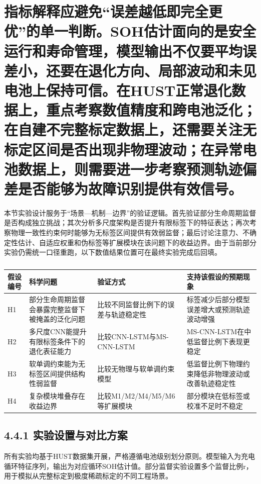 \documentclass[12pt, a4paper]{ctexart}
\begin{document}
\section{指标解释应避免“误差越低即完全更优”的单一判断。SOH估计面向的是安全运行和寿命管理，模型输出不仅要平均误差小，还要在退化方向、局部波动和未见电池上保持可信。在HUST正常退化数据上，重点考察数值精度和跨电池泛化；在自建不完整标定数据上，还需要关注无标定区间是否出现非物理波动；在异常电池数据上，则需要进一步考察预测轨迹偏差是否能够为故障识别提供有效信号。}

本节实验设计服务于“场景—机制—边界”的验证逻辑。首先验证部分生命周期监督是否构成独立挑战；其次分析多尺度架构是否提升有限标签下的特征表达；再次考察物理一致性约束何时能够为无标签区间提供有效弱监督；最后讨论注意力、不确定性估计、自适应权重和伪标签等扩展模块在该问题下的收益边界。由于当前部分实验仍需统一口径重跑，以下数值结果位置可在最终实验完成后回填。




\begin{table}[H]
  \centering
  \begin{tabular}{llll}
  \toprule
  假设编号 & 科学问题 & 验证方式 & 支持该假设的预期现象 \\
  \midrule
  H1 & 部分生命周期监督会暴露完整监督下被掩盖的泛化问题 & 比较不同监督比例下的误差与轨迹稳定性 & 标签减少后部分模型误差增大或预测轨迹波动增强 \\
  H2 & 多尺度CNN能提升有限标签条件下的退化表征能力 & 比较CNN-LSTM与MS-CNN-LSTM & MS-CNN-LSTM在中低监督比例下表现更稳定 \\
  H3 & 软单调约束能为无标签区间提供结构性弱监督 & 比较无物理与软单调约束模型 & 低监督比例下物理约束降低非物理波动或改善轨迹稳定性 \\
  H4 & 复杂模块堆叠存在收益边界 & 比较M1/M2/M4/M5/M6等扩展模块 & 部分模块在低标签或校准不足时不稳定 \\
  \bottomrule
  \end{tabular}
  \caption{}
  \label{tab:}
\end{table}



\subsection{4.4.1 实验设置与对比方案}

所有实验均基于HUST数据集开展，严格遵循电池级别划分原则。模型输入为充电循环特征序列，输出为对应循环SOH估计值。部分监督实验设置多个监督比例r，用于模拟从完整标定到极度稀疏标定的不同工程场景。
\end{document}
